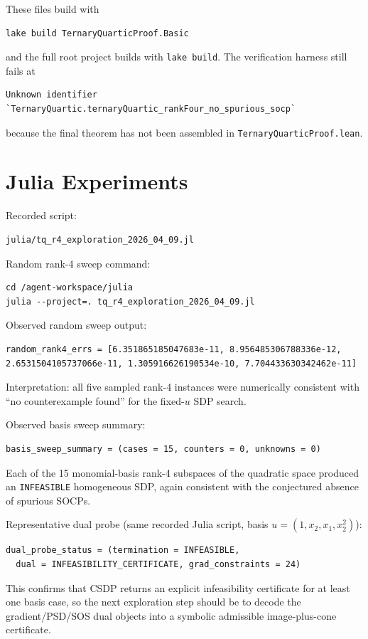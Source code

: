 \documentclass[11pt]{article}
\begin{document}
These files build with
\begin{verbatim}
lake build TernaryQuarticProof.Basic
\end{verbatim}
and the full root project builds with \texttt{lake build}. The verification
harness still fails at
\begin{verbatim}
Unknown identifier `TernaryQuartic.ternaryQuartic_rankFour_no_spurious_socp`
\end{verbatim}
because the final theorem has not been assembled in
\texttt{TernaryQuarticProof.lean}.

\section*{Julia Experiments}
Recorded script:
\begin{verbatim}
julia/tq_r4_exploration_2026_04_09.jl
\end{verbatim}

Random rank-4 sweep command:
\begin{verbatim}
cd /agent-workspace/julia
julia --project=. tq_r4_exploration_2026_04_09.jl
\end{verbatim}

Observed random sweep output:
\begin{verbatim}
random_rank4_errs = [6.351865185047683e-11, 8.956485306788336e-12,
2.6531504105737066e-11, 1.305916626190534e-10, 7.704433630342462e-11]
\end{verbatim}

Interpretation: all five sampled rank-4 instances were numerically consistent
with ``no counterexample found'' for the fixed-$u$ SDP search.

Observed basis sweep summary:
\begin{verbatim}
basis_sweep_summary = (cases = 15, counters = 0, unknowns = 0)
\end{verbatim}

Each of the 15 monomial-basis rank-4 subspaces of the quadratic space produced
an \texttt{INFEASIBLE} homogeneous SDP, again consistent with the conjectured
absence of spurious SOCPs.

Representative dual probe (same recorded Julia script, basis
$u = (1, x_2, x_1, x_2^2)$):
\begin{verbatim}
dual_probe_status = (termination = INFEASIBLE,
  dual = INFEASIBILITY_CERTIFICATE, grad_constraints = 24)
\end{verbatim}

This confirms that CSDP returns an explicit infeasibility certificate for at
least one basis case, so the next exploration step should be to decode the
gradient/PSD/SOS dual objects into a symbolic admissible image-plus-cone
certificate.
\end{document}
